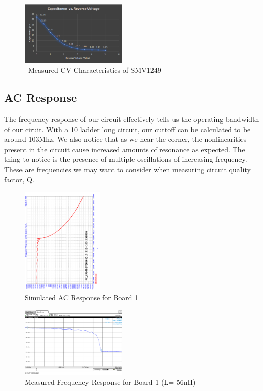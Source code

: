 \documentclass[journal]{IEEEtran} \usepackage[english]{babel}
\begin{document}
 
\begin{figure}[htb]
\centering
\includegraphics[width=0.45\textwidth]{SMV1249_CV}
\caption{\ Measured CV Characteristics of SMV1249 
}\label{fig:SMV1249CV}
\end{figure}


\subsection{AC Response}\label{ACMeasResults}

The frequency response of our circuit effectively tells us the operating
bandwidth of our ciruit. With a 10 ladder long circuit, our cuttoff can be
calculated to be around 103Mhz. We also notice that as we near the corner, the
nonlinearities present in the circuit cause increased amounts of resonance as
expected. The thing to notice is the presence of multiple oscillations of
increasing frequency. These are frequencies we may want to consider when
measuring circuit quality factor, Q.


\begin{figure}[htb]
\centering
\includegraphics[width=0.35\textwidth,angle = -90]{ACResponseB1.png}
\caption{Simulated AC Response for Board 1}
\label{fig:simACBoard1}
\end{figure}
 

\begin{figure}[htb]
\centering
\includegraphics[width=0.45\textwidth]{MeasuredACResponseB1.png}
\caption{Measured Frequency Response for Board 1 (L= 56nH)}
\label{fig:MeasACBoard1}
\end{figure}
\end{document}
